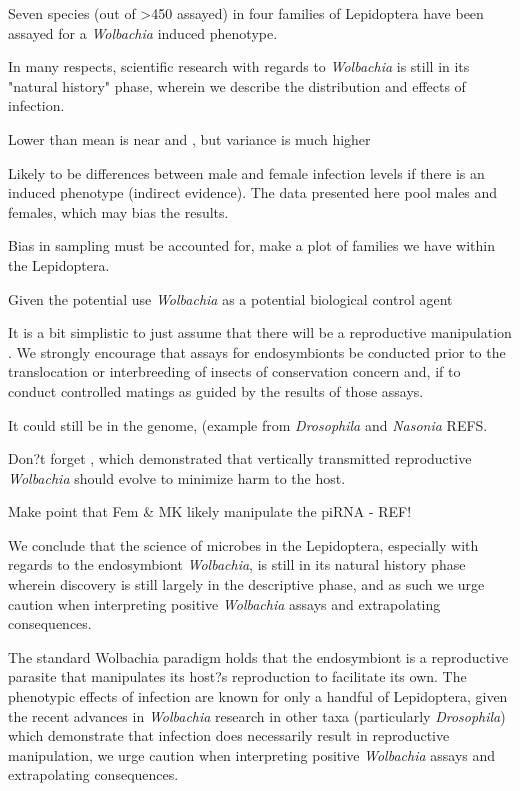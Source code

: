 \documentclass{frontiersSCNS} %
\begin{document}
Seven species (out of >450 assayed) in four families of Lepidoptera have been assayed for a \textit{Wolbachia} induced phenotype. 

In many respects, scientific research with regards to \textit{Wolbachia} is still in its "natural history" phase, wherein we describe the distribution and effects of infection.  

Lower than \citet{Hilgenboecker:2008aa}
mean is near \citet{Ahmed:2015aa} and \citet{Weinert:2015aa}, but variance is much higher

Likely to be differences between male and female infection levels if there is an induced phenotype (indirect evidence). The data presented here pool males and females, which may bias the results.

Bias in sampling must be accounted for, make a plot of families we have within the Lepidoptera.

Given the potential use \textit{Wolbachia} as a potential biological control agent



It is a bit simplistic to just assume that there will be a reproductive manipulation \citep{Nice:2009p7399,Hamm:2014wi}. We strongly encourage that assays for endosymbionts be conducted prior to the translocation or interbreeding of insects of conservation concern and, if to conduct controlled matings as guided by the results of those assays. 

It could still be in the genome, (example from \textit{Drosophila} and \textit{Nasonia} REFS.

Don?t forget \citet{Prout:1994th}, which demonstrated that vertically transmitted reproductive \textit{Wolbachia} should evolve to minimize harm to the host. 



\citet{vanNieukerken:2011a123}

\citet{Jiggins:2001p7754}

\citet{Jiggins:2001uo}


Make point that Fem \& MK likely manipulate the piRNA - REF!

We conclude that the science of microbes in the Lepidoptera, especially with regards to the endosymbiont \textit{Wolbachia}, is still in its natural history phase wherein discovery is still largely in the descriptive phase, and as such we urge caution when interpreting positive \textit{Wolbachia} assays and extrapolating consequences. 

The standard Wolbachia paradigm holds that the endosymbiont is a reproductive parasite that manipulates its host?s reproduction to facilitate its own. The phenotypic effects of infection are known for only a handful of Lepidoptera, given the recent advances in \textit{Wolbachia} research in other taxa (particularly \textit{Drosophila}) which demonstrate that infection does necessarily result in reproductive manipulation, we urge caution when interpreting positive \textit{Wolbachia} assays and extrapolating consequences.
\end{document}
